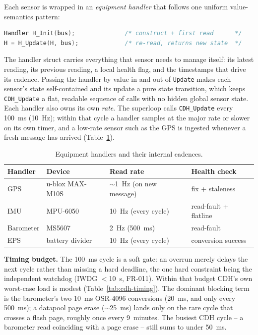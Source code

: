 Each sensor is wrapped in an \emph{equipment handler} that follows one
uniform value-semantics pattern:

\begin{lstlisting}[language=C]
Handler H_Init(bus);              /* construct + first read      */
H = H_Update(H, bus);             /* re-read, returns new state  */
\end{lstlisting}

The handler struct carries everything that sensor needs to manage itself:
its latest reading, its previous reading, a local health flag, and the
timestamps that drive its cadence. Passing the handler by value in and out
of \texttt{Update} makes each sensor's state self-contained and its update a
pure state transition, which keeps \texttt{CDH\_Update} a flat, readable
sequence of calls with no hidden global sensor state. Each handler also
owns its own \emph{rate}. The superloop calls \texttt{CDH\_Update} every
100~ms (10~Hz); within that cycle a handler samples at the major rate or
slower on its own timer, and a low-rate sensor such as the GPS is ingested
whenever a fresh message has arrived (Table~\ref{tab:cdh-handlers}).

\begin{table}[H]
\centering
\begin{tabular}{llll}
\toprule
\textbf{Handler} & \textbf{Device} & \textbf{Read rate} & \textbf{Health check} \\
\midrule
GPS       & u-blox MAX-M10S & $\sim$1~Hz (on new message) & fix + staleness \\
IMU       & MPU-6050        & 10~Hz (every cycle)         & read-fault + flatline \\
Barometer & MS5607          & 2~Hz (500~ms)               & read-fault \\
EPS       & battery divider & 10~Hz (every cycle)         & conversion success \\
\bottomrule
\end{tabular}
\caption{Equipment handlers and their internal cadences.}
\label{tab:cdh-handlers}
\end{table}

\textbf{Timing budget.} The 100~ms cycle is a soft gate: an overrun merely
delays the next cycle rather than missing a hard deadline, the one hard
constraint being the independent watchdog (IWDG $<$10~s, FR-011). Within that
budget CDH's own worst-case load is modest (Table~\ref{tab:cdh-timing}). The
dominant blocking term is the barometer's two 10~ms OSR-4096 conversions
(20~ms, and only every 500~ms); a datapool page erase ($\sim$25~ms) lands only
on the rare cycle that crosses a flash page, roughly once every 9~minutes. The
busiest CDH cycle -- a barometer read coinciding with a page erase -- still
sums to under 50~ms.


